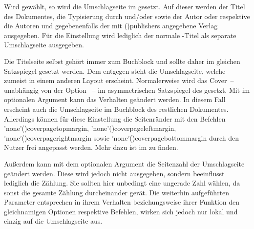 \begin{DeclareEntity*}{}
\begin{DeclareEntity*}{}
\begin{DeclareEntity*}{}
\begin{Declaration}
\begin{Declaration}
\begin{Declaration}
\begin{Declaration}
\begin{Declaration}
\begin{Declaration}
\begin{Declaration}
\begin{Declaration}
\begin{Declaration}
\begin{Declaration}
\begin{Declaration}
Wird  gewählt, so wird die Umschlagseite im \TUDCD 
gesetzt. Auf dieser werden der Titel des Dokumentes, die Typisierung 
durch  und/oder  sowie der Autor oder respektive 
die Autoren und gegebenenfalls der mit \Macro(){publishers}
angegebene Verlag ausgegeben.
%
Für die Einstellung  wird lediglich der normale 
\KOMAScript-Titel als separate Umschlagseite ausgegeben. 

Die Titelseite selbst gehört immer zum Buchblock und sollte daher im gleichen 
Satzspiegel gesetzt werden. Dem entgegen steht die Umschlagseite, welche 
zumeist in einem anderen Layout erscheint. Normalerweise wird das Cover~-- 
unabhängig von der Option ~-- im asymmetrischen Satzspiegel 
des \CDs gesetzt. Mit  im optionalen 
Argument kann das Verhalten geändert werden. In diesem Fall erscheint auch die 
Umschlagseite im Buchblock des restlichen Dokumentes. Allerdings können für 
diese Einstellung die Seitenränder mit den Befehlen 
\Macro'none'(){coverpagetopmargin}, 
\Macro'none'(){coverpageleftmargin}, 
\Macro'none'(){coverpagerightmargin} sowie 
\Macro'none'(){coverpagebottommargin} 
durch den Nutzer frei angepasst werden. Mehr dazu ist im \scrguide zu finden.

Außerdem kann mit dem optionalen Argument die Seitenzahl der Umschlagseite 
geändert werden. Diese wird jedoch nicht ausgegeben, sondern beeinflusst 
lediglich die Zählung. Sie sollten hier unbedingt eine ungerade Zahl wählen, da 
sonst die gesamte Zählung durcheinander gerät. Die weiterhin aufgeführten 
Parameter entsprechen in ihrem Verhalten beziehungsweise ihrer Funktion den 
gleichnamigen Optionen respektive Befehlen, wirken sich jedoch nur lokal und 
einzig auf die Umschlagseite aus.%
\end{Declaration}
\end{Declaration}
\end{Declaration}
\end{Declaration}
\end{Declaration}
\end{Declaration}
\end{Declaration}
\end{Declaration}
\end{Declaration}
\end{Declaration}
\end{Declaration}


\end{DeclareEntity*}
\end{DeclareEntity*}
\end{DeclareEntity*}
